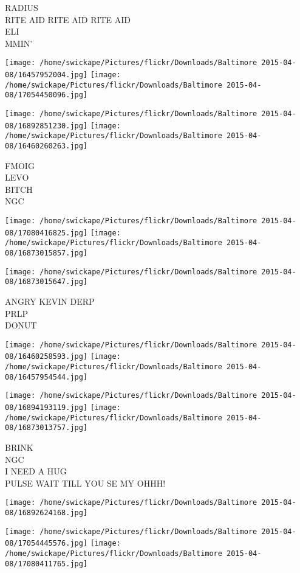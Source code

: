 \documentclass[10pt,letterpaper]{article}
\begin{document}
RADIUS\\
RITE AID RITE AID RITE AID\\
ELI\\
MMIN'
\pagebreak

\texttt{[image: /home/swickape/Pictures/flickr/Downloads/Baltimore 2015-04-08/16457952004.jpg]}
\texttt{[image: /home/swickape/Pictures/flickr/Downloads/Baltimore 2015-04-08/17054450096.jpg]}

\texttt{[image: /home/swickape/Pictures/flickr/Downloads/Baltimore 2015-04-08/16892851230.jpg]}
\texttt{[image: /home/swickape/Pictures/flickr/Downloads/Baltimore 2015-04-08/16460260263.jpg]}

FMOIG\\
LEVO\\
BITCH\\
NGC
\pagebreak

\texttt{[image: /home/swickape/Pictures/flickr/Downloads/Baltimore 2015-04-08/17080416825.jpg]}
\texttt{[image: /home/swickape/Pictures/flickr/Downloads/Baltimore 2015-04-08/16873015857.jpg]}

\vspace{0.25in}
\texttt{[image: /home/swickape/Pictures/flickr/Downloads/Baltimore 2015-04-08/16873015647.jpg]}

ANGRY KEVIN DERP\\
PRLP\\
DONUT
\pagebreak

\texttt{[image: /home/swickape/Pictures/flickr/Downloads/Baltimore 2015-04-08/16460258593.jpg]}
\texttt{[image: /home/swickape/Pictures/flickr/Downloads/Baltimore 2015-04-08/16457954544.jpg]}

\texttt{[image: /home/swickape/Pictures/flickr/Downloads/Baltimore 2015-04-08/16894193119.jpg]}
\texttt{[image: /home/swickape/Pictures/flickr/Downloads/Baltimore 2015-04-08/16873013757.jpg]}

BRINK\\
NGC\\
I NEED A HUG\\
PULSE WAIT TILL YOU SE MY OHHH!
\pagebreak

\texttt{[image: /home/swickape/Pictures/flickr/Downloads/Baltimore 2015-04-08/16892624168.jpg]}

\vspace{0.25in}
\texttt{[image: /home/swickape/Pictures/flickr/Downloads/Baltimore 2015-04-08/17054445576.jpg]}
\texttt{[image: /home/swickape/Pictures/flickr/Downloads/Baltimore 2015-04-08/17080411765.jpg]}
\end{document}
